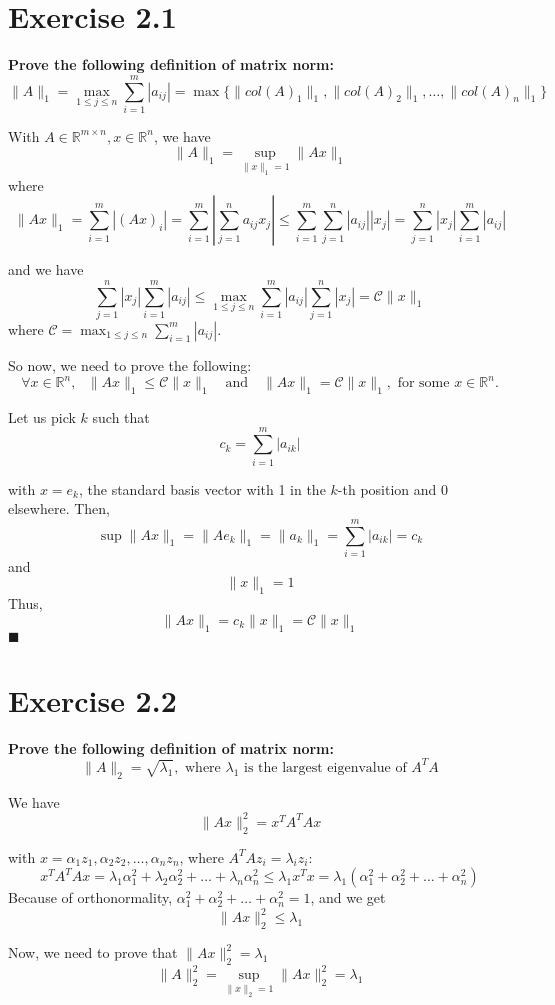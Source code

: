 \documentclass[11pt]{article}
\begin{document}
\section*{Exercise 2.1}
\textbf{\large Prove the following definition of matrix norm:}
\[\|A\|_1 = \max_{1 \leq j \leq n} \sum_{i=1}^m |a_{ij}| = \max \{\|col(A)_1\|_1, \|col(A)_2\|_1, \ldots, \|col(A)_n\|_1\}\]

With \(A \in \mathbb{R}^{m \times n}, x \in \mathbb{R}^n\), we have
\[\|A\|_1 = \sup_{\|x\|_1 = 1} \|Ax\|_1\]
where
\[\|Ax\|_1 = \sum_{i=1}^m |(Ax)_i| = \sum_{i=1}^m \left|\sum_{j=1}^n a_{ij}x_j\right| \leq \sum_{i=1}^m \sum_{j=1}^n |a_{ij}||x_j| = \sum_{j=1}^n |x_j| \sum_{i=1}^m |a_{ij}|\]

and we have 
\[\sum_{j=1}^n |x_j| \sum_{i=1}^m |a_{ij}| \leq \max_{1 \leq j \leq n} \sum_{i=1}^m |a_{ij}| \sum_{j=1}^n |x_j| = \mathcal{C} \|x\|_1\]
where \(\mathcal{C} = \max_{1 \leq j \leq n} \sum_{i=1}^m |a_{ij}|\).

So now, we need to prove the following:
\[\forall x \in \mathbb{R}^n,\text{ } \|Ax\|_1 \leq \mathcal{C} \|x\|_1 \quad \text{and} \quad \|Ax\|_1 = \mathcal{C} \|x\|_1, \text{ for some } x \in \mathbb{R}^n.\]

Let us pick \(k\) such that
\[c_k = \sum_{i=1}^m |a_{ik}|\]

with \(x = e_k\), the standard basis vector with 1 in the \(k\)-th position and 0 elsewhere. Then,
\[\sup \|Ax\|_1 = \|A e_k\|_1 = \|a_k\|_1 = \sum_{i=1}^m |a_{ik}| = c_k \]
and
\[\|x\|_1 = 1\]
Thus,
\[\|Ax\|_1 = c_k \|x\|_1 = \mathcal{C} \|x\|_1\]
\hfill \(\blacksquare\)

\section*{Exercise 2.2}
\textbf{\large Prove the following definition of matrix norm:}
\[\|A\|_2 = \sqrt{\lambda_1}, \text{ where } \lambda_1 \text{ is the largest eigenvalue of } A^TA\]

We have
\[\|Ax\|_2^2 = x^T A^T A x\]

with \(x = \alpha_1 z_1, \alpha_2 z_2, \ldots, \alpha_n z_n\), where \(A^T A z_i = \lambda_i z_i\):
\[x^T A^T A x = \lambda_1 \alpha_1^2 + \lambda_2 \alpha_2^2 + \ldots + \lambda_n \alpha_n^2 \leq \lambda_1 x^T x = \lambda_1 \left(\alpha_1^2 + \alpha_2^2 + \ldots + \alpha_n^2\right)\]
Because of orthonormality, \(\alpha_1^2 + \alpha_2^2 + \ldots + \alpha_n^2 = 1\), and we get
\[\|Ax\|_2^2 \leq \lambda_1\]

Now, we need to prove that \(\|Ax\|_2^2 = \lambda_1\)
\[\|A\|_2^2 = \sup_{\|x\|_2 = 1} \|Ax\|_2^2 = \lambda_1\]
\end{document}

